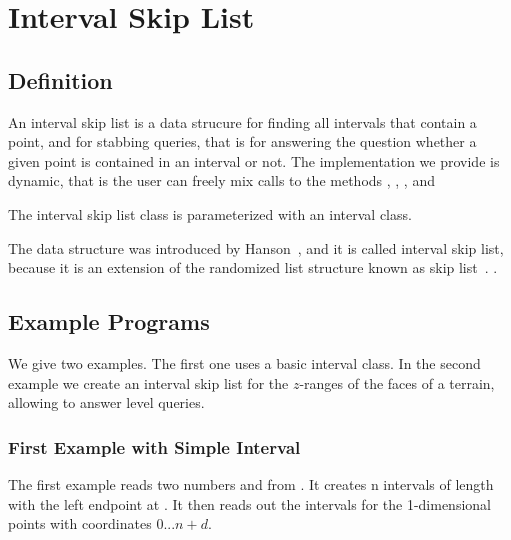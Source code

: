 
\section{Interval Skip List}


\subsection{Definition}
  
An interval skip list is a data strucure for finding all intervals 
that contain a point, and for stabbing queries, that is for answering 
the question whether a given point is contained in an interval or not. 
The implementation we provide is dynamic, that is the user can freely
mix calls  to the methods , , 
, and 

The interval skip list class is parameterized with an interval class.

The data structure was introduced by Hanson~\cite{}, and it is called
interval skip list, because it is an extension of the randomized list
structure known as skip list~\cite{}. .
 
\subsection{Example Programs}
\label{sectionIntervalskiplistExamples}

We give two examples. The first one uses a basic interval class.  In
the second example we create an interval skip list for the $z$-ranges
of the faces of a terrain, allowing to answer level queries.

\subsubsection{First Example with Simple Interval}

The first example reads two numbers  and  from .
It creates n intervals of length  with the left endpoint at .
It then reads out the intervals for the 1-dimensional points with
coordinates $0 ... n+d$. 


